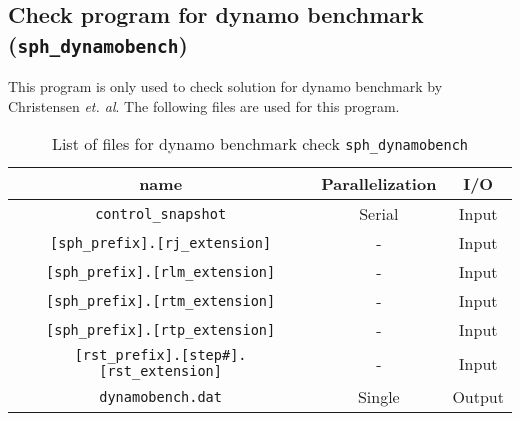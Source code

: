 \subsection{Check program for dynamo benchmark \\
({\tt sph\_dynamobench})}
\label{section:check_bench}
This program is only used to check solution for dynamo benchmark by Christensen {\it et. al}. The following files are used for this program.

\begin{table}[htp]
\caption{List of files for dynamo benchmark check {\tt sph\_dynamobench} }
\begin{center} 
\begin{tabular}{|c|c|c|}
\hline
 name & Parallelization & I/O \\ \hline \hline
\verb|control_snapshot| & Serial & Input \\ \hline
\verb|[sph_prefix].[rj_extension]|  & - & Input \\
\verb|[sph_prefix].[rlm_extension]| & - & Input \\
\verb|[sph_prefix].[rtm_extension]| & - & Input \\
\verb|[sph_prefix].[rtp_extension]| & - & Input \\ \hline
\verb|[rst_prefix].[step#].[rst_extension]| &  - & Input  \\ \hline
\verb|dynamobench.dat| & Single & Output \\ \hline
\end{tabular}
\end{center}
\label{table:sph_dynamobench}
\end{table}


